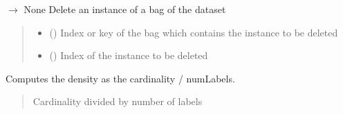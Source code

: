 \documentclass[letterpaper,10pt,english]{sphinxmanual}
\begin{document}
\begin{fulllineitems}
\begin{fulllineitems}
\begin{quote}
\begin{description}
\end{description}\end{quote}

\end{fulllineitems}


\begin{fulllineitems}
\label{\detokenize{data/_autosummary/miml.data.miml_dataset.MIMLDataset:miml.data.miml_dataset.MIMLDataset.delete_instance}}
\pysigstartsignatures
\pysiglinewithargsret
{}
{\sphinxparamcomma {}}
{{ $\rightarrow$ None}}
\pysigstopsignatures
\sphinxAtStartPar
Delete an instance of a bag of the dataset
\begin{quote}\begin{description}
\begin{itemize}
\item {} 
\sphinxAtStartPar
{} () \textendash{} Index or key of the bag which contains the instance to be deleted

\item {} 
\sphinxAtStartPar
{} () \textendash{} Index of the instance to be deleted

\end{itemize}

\end{description}\end{quote}

\end{fulllineitems}


\begin{fulllineitems}
\label{\detokenize{data/_autosummary/miml.data.miml_dataset.MIMLDataset:miml.data.miml_dataset.MIMLDataset.density}}
\pysigstartsignatures
\pysiglinewithargsret
{}
{}
{}
\pysigstopsignatures
\sphinxAtStartPar
Computes the density as the cardinality / numLabels.
\begin{quote}\begin{description}
\sphinxAtStartPar
{} \textendash{} Cardinality divided by number of labels


\end{description}
\end{quote}
\end{fulllineitems}
\end{fulllineitems}
\end{document}
